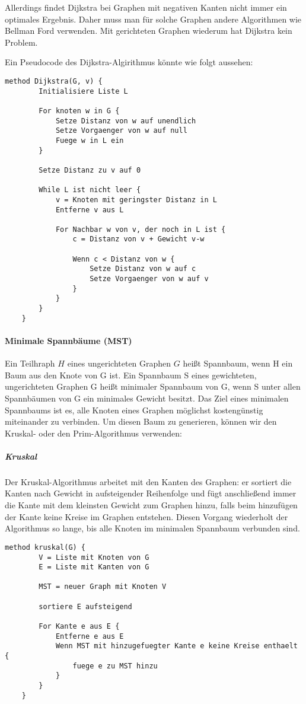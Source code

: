 \documentclass{article}
\begin{document}
	Allerdings findet Dijkstra bei Graphen mit negativen Kanten nicht immer ein optimales Ergebnis. Daher muss man für solche Graphen andere Algorithmen wie Bellman Ford verwenden. Mit gerichteten Graphen wiederum hat Dijkstra kein Problem.

	\newpage

	Ein Pseudocode des Dijkstra-Algirithmus könnte wie folgt aussehen:

	\begin{lstlisting}[caption=Dijkstra in Pseudocode]
	method Dijkstra(G, v) {
		Initialisiere Liste L

		For knoten w in G {
			Setze Distanz von w auf unendlich
			Setze Vorgaenger von w auf null
			Fuege w in L ein
		}

		Setze Distanz zu v auf 0

		While L ist nicht leer {
			v = Knoten mit geringster Distanz in L
			Entferne v aus L

			For Nachbar w von v, der noch in L ist {
				c = Distanz von v + Gewicht v-w

				Wenn c < Distanz von w {
					Setze Distanz von w auf c
					Setze Vorgaenger von w auf v
				}
			}
		}
	}
	\end{lstlisting}

	\paragraph{Minimale Spannbäume (MST)}
	Ein Teilhraph $H$ eines ungerichteten Graphen $G$ heißt Spannbaum, wenn H ein Baum aus den Knote von G ist. Ein Spannbaum S eines gewichteten, ungerichteten Graphen G heißt minimaler Spannbaum von G, wenn S unter allen Spannbäumen von G ein minimales Gewicht besitzt. Das Ziel eines minimalen Spannbaums ist es, alle Knoten eines Graphen möglichst kostengünstig miteinander zu verbinden. Um diesen Baum zu generieren, können wir den Kruskal- oder den Prim-Algorithmus verwenden:

	\subparagraph{Kruskal}
	Der Kruskal-Algorithmus arbeitet mit den Kanten des Graphen: er sortiert die Kanten nach Gewicht in aufsteigender Reihenfolge und fügt anschließend immer die Kante mit dem kleinsten Gewicht zum Graphen hinzu, falls beim hinzufügen der Kante keine Kreise im Graphen entstehen. Diesen Vorgang wiederholt der Algorithmus so lange, bis alle Knoten im minimalen Spannbaum verbunden sind.

	\begin{lstlisting}[caption=Der Kruskal-Algorithmus in Pseudocode]
	method kruskal(G) {
		V = Liste mit Knoten von G
		E = Liste mit Kanten von G

		MST = neuer Graph mit Knoten V

		sortiere E aufsteigend

		For Kante e aus E {
			Entferne e aus E
			Wenn MST mit hinzugefuegter Kante e keine Kreise enthaelt {
				fuege e zu MST hinzu
			}
		}
	}
	\end{lstlisting}
\end{document}
